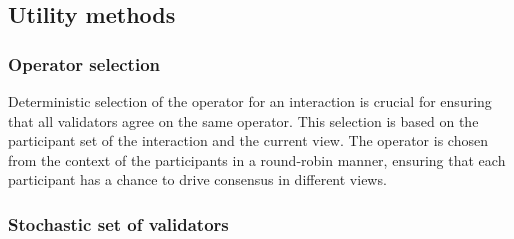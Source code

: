 
\subsection{Utility methods}

\subsubsection{Operator selection}

Deterministic selection of the operator for an interaction is crucial for ensuring that all validators agree on the same operator. This selection is based on the participant set of the interaction and the current view. The operator is chosen from the context of the participants in a round-robin manner, ensuring that each participant has a chance to drive consensus in different views.


\subsubsection{Stochastic set of validators}

